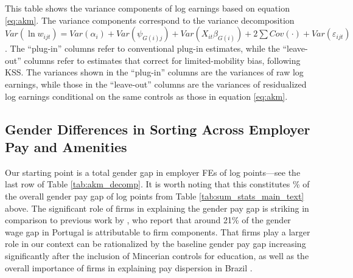 %
\begin{table}[htbp!]
    \caption{Variance decompositions based on plug-in and leave-out estimates}
    \label{tab:akm_decomp}
    \resizebox{\textwidth}{!}{%
    
    }
    \begin{tablenotes}
        \footnotesize
        This table shows the variance components of log earnings based on equation \eqref{eq:akm}. %
        The variance components correspond to the variance decomposition $Var(\ln w_{ijt}) = Var(\alpha_{i}) + Var(\psi_{G(i)j}) + Var(X_{it}\beta_{G(i)}) + 2 \sum Cov(\cdot) + Var(\varepsilon_{ijt})$. The ``plug-in'' columns refer to conventional plug-in estimates, while the ``leave-out'' columns refer to estimates that correct for limited-mobility bias, following KSS. The variances shown in the ``plug-in'' columns are the variances of raw log earnings, while those in the ``leave-out'' columns are the variances of residualized log earnings conditional on the same controls as those in equation \eqref{eq:akm}.
    \end{tablenotes}
    \begin{tablenotes}[Source]
        \sourcedata
    \end{tablenotes}
\end{table}
%


\subsection{Gender Differences in Sorting Across Employer Pay and Amenities\label{subsec:between_vs_within}}

Our starting point is a total gender gap in employer FEs of  log points---see the last row of Table \ref{tab:akm_decomp}.
%
It is worth noting that this constitutes \% of the overall gender pay gap of  log points from Table \ref{tab:sum_stats_main_text} above. The significant role of firms in explaining the gender pay gap is striking in comparison to previous work by \citet[][Table III]{CardCardosoKline2016}, who report that around 21\% of the gender wage gap in Portugal is attributable to firm components. That firms play a larger role in our context can be rationalized by the baseline gender pay gap increasing significantly after the inclusion of Mincerian controls for education, as well as the overall importance of firms in explaining pay dispersion in Brazil \citep{AlvarezBenguriaEngbomMoser2018, EngbomMoser2022a, FirpoPortella2025}.
%

